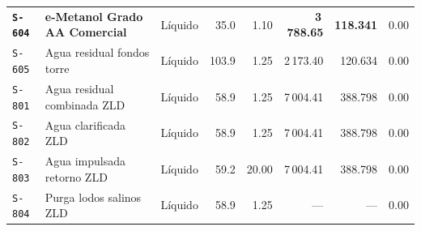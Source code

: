 \documentclass[10pt,letterpaper]{article}
\begin{document}
\begin{xltabular}{\textwidth}{l >{\raggedright\arraybackslash}X c r r r r c}
\textbf{\texttt{S-604}} & \textbf{e-Metanol Grado AA Comercial} & Líquido & 35.0 & 1.10 & \textbf{3\,788.65} & \textbf{118.341} & 0.00 \\
\texttt{S-605} & Agua residual fondos torre & Líquido & 103.9 & 1.25 & 2\,173.40 & 120.634 & 0.00 \\
\texttt{S-801} & Agua residual combinada ZLD & Líquido & 58.9 & 1.25 & 7\,004.41 & 388.798 & 0.00 \\
\texttt{S-802} & Agua clarificada ZLD & Líquido & 58.9 & 1.25 & 7\,004.41 & 388.798 & 0.00 \\
\texttt{S-803} & Agua impulsada retorno ZLD & Líquido & 59.2 & 20.00 & 7\,004.41 & 388.798 & 0.00 \\
\texttt{S-804} & Purga lodos salinos ZLD & Líquido & 58.9 & 1.25 & --- & --- & 0.00 \\
\end{xltabular}
\end{document}
